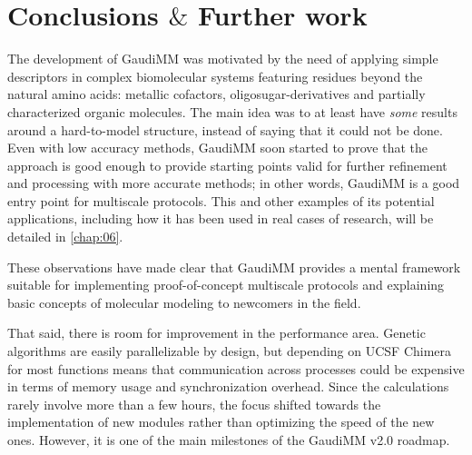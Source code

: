 \section{Conclusions $\&$  Further work}

The development of GaudiMM was motivated by the need of applying simple descriptors in complex biomolecular systems featuring residues beyond the natural amino acids: metallic cofactors, oligosugar-derivatives and partially characterized organic molecules. The main idea was to at least have \textit{some} results around a hard-to-model structure, instead of saying that it could not be done. Even with low accuracy methods, GaudiMM soon started to prove that the approach is good enough to provide starting points valid for further refinement and processing with more accurate methods; in other words, GaudiMM is a good entry point for multiscale protocols. This and other examples of its potential applications, including how it has been used in real cases of research, will be detailed in \autoref{chap:06}.

These observations have made clear that GaudiMM provides a mental framework suitable for implementing proof-of-concept multiscale protocols and explaining basic concepts of molecular modeling to newcomers in the field.

That said, there is room for improvement in the performance area. Genetic algorithms are easily parallelizable by design, but depending on UCSF Chimera for most functions means that communication across processes could be expensive in terms of memory usage and synchronization overhead. Since the calculations rarely involve more than a few hours, the focus shifted towards the implementation of new modules rather than optimizing the speed of the new ones. However, it is one of the main milestones of the GaudiMM v2.0 roadmap.
